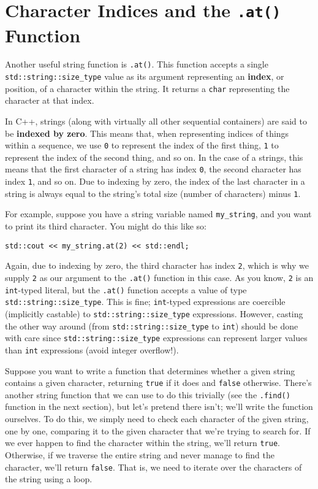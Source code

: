 \documentclass{article}
\begin{document}
\section{Character Indices and the \texttt{.at()} Function}

Another useful string function is \texttt{.at()}. This function accepts a single \texttt{std::string::size\_type} value as its argument representing an \textbf{index}, or position, of a character within the string. It returns a \texttt{char} representing the character at that index.

In C++, strings (along with virtually all other sequential containers) are said to be \textbf{indexed by zero}. This means that, when representing indices of things within a sequence, we use \texttt{0} to represent the index of the first thing, \texttt{1} to represent the index of the second thing, and so on. In the case of a strings, this means that the first character of a string has index \texttt{0}, the second character has index \texttt{1}, and so on. Due to indexing by zero, the index of the last character in a string is always equal to the string's total size (number of characters) minus \texttt{1}.

For example, suppose you have a string variable named \texttt{my\_string}, and you want to print its third character. You might do this like so:

\begin{verbatim}
std::cout << my_string.at(2) << std::endl;
\end{verbatim}

Again, due to indexing by zero, the third character has index \texttt{2}, which is why we supply \texttt{2} as our argument to the \texttt{.at()} function in this case. As you know, \texttt{2} is an \texttt{int}-typed literal, but the \texttt{.at()} function accepts a value of type \texttt{std::string::size\_type}. This is fine; \texttt{int}-typed expressions are coercible (implicitly castable) to \texttt{std::string::size\_type} expressions. However, casting the other way around (from \texttt{std::string::size\_type} to \texttt{int}) should be done with care since \texttt{std::string::size\_type} expressions can represent larger values than \texttt{int} expressions (avoid integer overflow!).

Suppose you want to write a function that determines whether a given string contains a given character, returning \texttt{true} if it does and \texttt{false} otherwise. There's another string function that we can use to do this trivially (see the \texttt{.find()} function in the next section), but let's pretend there isn't; we'll write the function ourselves. To do this, we simply need to check each character of the given string, one by one, comparing it to the given character that we're trying to search for. If we ever happen to find the character within the string, we'll return \texttt{true}. Otherwise, if we traverse the entire string and never manage to find the character, we'll return \texttt{false}. That is, we need to iterate over the characters of the string using a loop.
\end{document}
